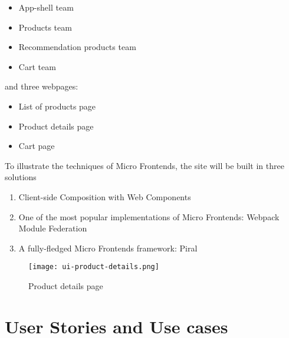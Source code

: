 \documentclass[a4paper]{book}
\begin{document}
\begin{itemize}
    \item App-shell team
    \item Products team
    \item Recommendation products team
    \item Cart team
\end{itemize}
and three webpages:

\begin{itemize}
    \item List of products page
    \item Product details page
    \item Cart page
\end{itemize}
To illustrate the techniques of Micro Frontends, the site will be built in three solutions

\begin{enumerate}
    \item Client-side Composition with Web Components
    \item One of the most popular implementations of Micro Frontends: Webpack Module Federation
    \item A fully-fledged Micro Frontends framework: Piral
\end{enumerate}



\clearpage
\begin{figure}[h!]
    \centering
    \captionsetup{justification=centering}
    \texttt{[image: ui-product-details.png]}
    \caption{Product details page}
    \label{fig:ui-product-details}
\end{figure}

\section{User Stories and Use cases} \label{User Stories and Use cases}
\end{document}
